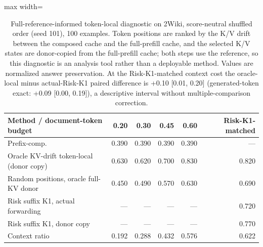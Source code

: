 \begin{table}[t]
\centering
\footnotesize
\begin{adjustbox}{max width=\textwidth}
\begin{tabular}{lrrrrr}
\toprule
Method / document-token budget & 0.20 & 0.30 & 0.45 & 0.60 & Risk-K1-matched \\
\midrule
Prefix-comp. & 0.390 & 0.390 & 0.390 & 0.390 & --- \\
Oracle KV-drift token-local (donor copy) & 0.630 & 0.620 & 0.700 & 0.830 & 0.820 \\
Random positions, oracle full-KV donor & 0.450 & 0.490 & 0.570 & 0.630 & 0.690 \\
Risk suffix K1, actual forwarding & --- & --- & --- & --- & 0.720 \\
Risk suffix K1, donor copy & --- & --- & --- & --- & 0.770 \\
Context ratio & 0.192 & 0.288 & 0.432 & 0.576 & 0.622 \\
\bottomrule
\end{tabular}
\end{adjustbox}
\caption{Full-reference-informed token-local diagnostic on 2Wiki, score-neutral shuffled order (seed 101), 100 examples. Token positions are ranked by the K/V drift between the composed cache and the full-prefill cache, and the selected K/V states are donor-copied from the full-prefill cache; both steps use the reference, so this diagnostic is an analysis tool rather than a deployable method. Values are normalized answer preservation. At the Risk-K1-matched context cost the oracle-local minus actual-Risk-K1 paired difference is +0.10 [0.01, 0.20] (generated-token exact: +0.09 [0.00, 0.19]), a descriptive interval without multiple-comparison correction.}
\label{tab:app-oracle-local}
\end{table}
